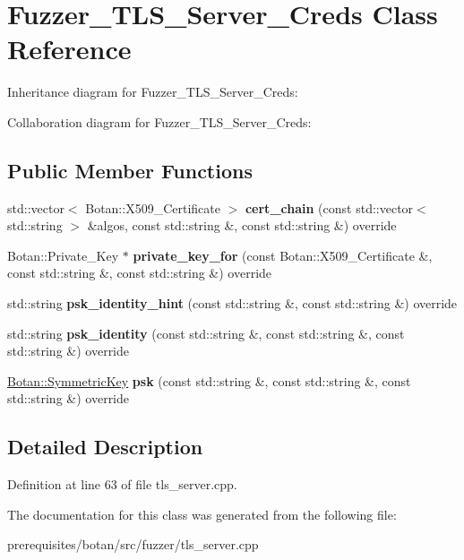 \hypertarget{class_fuzzer___t_l_s___server___creds}{}\section{Fuzzer\+\_\+\+T\+L\+S\+\_\+\+Server\+\_\+\+Creds Class Reference}
\label{class_fuzzer___t_l_s___server___creds}


Inheritance diagram for Fuzzer\+\_\+\+T\+L\+S\+\_\+\+Server\+\_\+\+Creds\+:


Collaboration diagram for Fuzzer\+\_\+\+T\+L\+S\+\_\+\+Server\+\_\+\+Creds\+:
\subsection*{Public Member Functions}
\begin{DoxyCompactItemize}
\item 
\mbox{\label{class_fuzzer___t_l_s___server___creds_afa76610593f41176d6f704ad4a6654bc}} 
std\+::vector$<$ Botan\+::\+X509\+\_\+\+Certificate $>$ {\bfseries cert\+\_\+chain} (const std\+::vector$<$ std\+::string $>$ \&algos, const std\+::string \&, const std\+::string \&) override
\item 
\mbox{\label{class_fuzzer___t_l_s___server___creds_a5b152c1587a9744e32d40f597fdff7a1}} 
Botan\+::\+Private\+\_\+\+Key $\ast$ {\bfseries private\+\_\+key\+\_\+for} (const Botan\+::\+X509\+\_\+\+Certificate \&, const std\+::string \&, const std\+::string \&) override
\item 
\mbox{\label{class_fuzzer___t_l_s___server___creds_a2285ed6a580e08844e59c7198d070aeb}} 
std\+::string {\bfseries psk\+\_\+identity\+\_\+hint} (const std\+::string \&, const std\+::string \&) override
\item 
\mbox{\label{class_fuzzer___t_l_s___server___creds_abce822bbb03792ab96cf59aac8343f09}} 
std\+::string {\bfseries psk\+\_\+identity} (const std\+::string \&, const std\+::string \&, const std\+::string \&) override
\item 
\mbox{\label{class_fuzzer___t_l_s___server___creds_a1238946ffffc0ec1db9c7804de545748}} 
\mbox{\hyperlink{namespace_botan_a89cf6c3513428f524454d01830221a88}{Botan\+::\+Symmetric\+Key}} {\bfseries psk} (const std\+::string \&, const std\+::string \&, const std\+::string \&) override
\end{DoxyCompactItemize}


\subsection{Detailed Description}


Definition at line 63 of file tls\+\_\+server.\+cpp.



The documentation for this class was generated from the following file\+:\begin{DoxyCompactItemize}
\item 
prerequisites/botan/src/fuzzer/tls\+\_\+server.\+cpp\end{DoxyCompactItemize}
